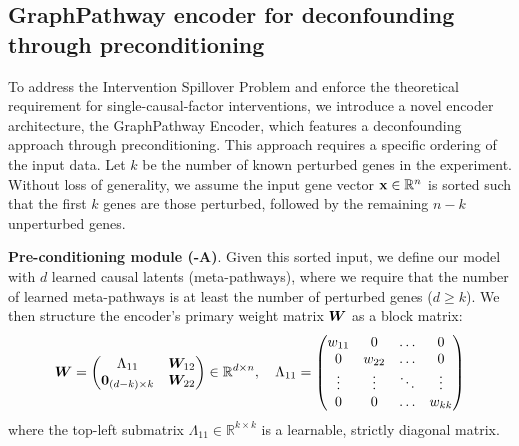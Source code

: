 \documentclass[10pt,letterpaper]{article}
\def\vzero{{\bm{0}}}\def\vone{{\bm{1}}}
\theoremstyle{definition}
\theoremstyle{remark}
\newcommand{\realnumbers}{\mathbb{R}}
\newcommand{\variables}{\rvx}
\newcommand{\weightmatrix}{\mW}
\newcommand{\observeddim}{n}
\newcommand{\latentdim}{d}
\newcommand{\numperturbedgenes}{k}
\begin{document}
\subsection*{GraphPathway encoder for deconfounding through preconditioning}
To address the Intervention Spillover Problem and enforce the theoretical requirement for single-causal-factor interventions, we introduce a novel encoder architecture, the GraphPathway Encoder, which features a deconfounding approach through preconditioning.
This approach requires a specific ordering of the input data.
Let $\numperturbedgenes$ be the number of known perturbed genes in the experiment.
Without loss of generality, we assume the input gene vector $\variables \in \realnumbers^\observeddim$ is sorted such that the first $\numperturbedgenes$ genes are those perturbed, followed by the remaining $\observeddim-\numperturbedgenes$ unperturbed genes.

\textbf{Pre-conditioning module (-A)}. Given this sorted input, we define our model with $\latentdim$ learned causal latents (meta-pathways), where we require that the number of learned meta-pathways is at least the number of perturbed genes ($\latentdim \ge \numperturbedgenes$).
We then structure the encoder's primary weight matrix $\weightmatrix$ as a block matrix:
\begin{equation}
    \weightmatrix =
    \begin{pmatrix}
        \Lambda_{11}   & \weightmatrix_{12} \\
        \vzero_{(\latentdim-\numperturbedgenes) \times \numperturbedgenes} & \weightmatrix_{22}
    \end{pmatrix}
    \in \realnumbers^{\latentdim \times \observeddim}
    , \quad
    \Lambda_{11} =
    \begin{pmatrix}
        w_{11} & 0      & \dots  & 0 \\
        0      & w_{22} & \dots  & 0 \\
        \vdots & \vdots & \ddots & \vdots \\
        0      & 0      & \dots  & w_{\numperturbedgenes\numperturbedgenes}
    \end{pmatrix}
    \label{eq:preconditioning_matrix}
\end{equation}
where the top-left submatrix $\Lambda_{11} \in \realnumbers^{\numperturbedgenes \times \numperturbedgenes}$ is a learnable, strictly diagonal matrix.
\end{document}
